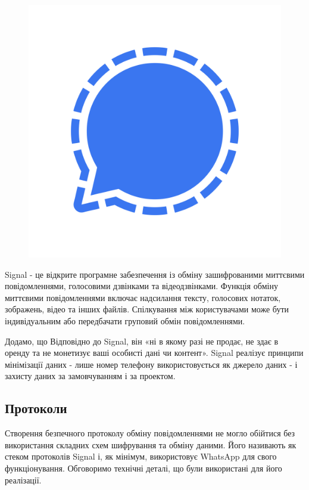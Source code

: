 \begin{figure}
    \includegraphics[width=0.9\linewidth]{../IMAGES/signal.png} 
    \label{fig:signal}
\end{figure}

Signal - це відкрите програмне забезпечення із обміну зашифрованими миттєвими повідомленнями, голосовими дзвінками та відеодзвінками. Функція обміну миттєвими повідомленнями включає надсилання тексту, голосових нотаток, зображень, відео та інших файлів. Спілкування між користувачами може бути індивідуальним або передбачати груповий обмін повідомленнями. 

Додамо, що Відповідно до Signal, він «ні в якому разі не продає, не здає в оренду та не монетизує ваші особисті дані чи контент». Signal реалізує принципи мінімізації даних - лише номер телефону використовується як джерело даних - і захисту даних за замовчуванням і за проектом.

\subsection{Протоколи}

Створення безпечного протоколу обміну повідомленнями не могло обійтися без використання складних схем шифрування та обміну даними. Його називають як стеком протоколів Signal і, як мінімум, використовує WhatsApp для свого функціонування. Обговоримо технічні деталі, що були використані для його реалізації.

